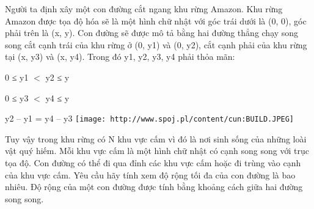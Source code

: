 Người ta định xây một con đường cắt ngang khu rừng Amazon. Khu rừng Amazon được tọa độ hóa sẽ là một hình chữ nhật với góc trái dưới là (0, 0), góc phải trên là (x, y). Con đường sẽ được mô tả bằng hai đường thẳng chạy song song cắt cạnh trái của khu rừng ở (0, y1) và (0, y2), cắt cạnh phải của khu rừng tại (x, y3) và (x, y4). Trong đó y1, y2, y3, y4 phải thỏa mãn:  

   0 ≤ y1 $<$ y2 ≤ y  

   0 ≤ y3 $<$ y4 ≤ y  

   y2 – y1 = y4 – y3  
\texttt{[image: http://www.spoj.pl/content/cun:BUILD.JPEG]}

   Tuy vậy trong khu rừng có N khu vực cấm vì đó là nơi sinh sống của những loài vật quý hiếm. Mỗi khu vực cấm là một hình chữ nhật có cạnh song song với trục tọa độ. Con đường có thể đi qua đỉnh các khu vực cấm hoặc đi trùng vào cạnh của khu vực cấm. Yêu cầu hãy tính xem độ rộng tối đa của con đường là bao nhiêu. Độ rộng của một con đường được tính bằng khoảng cách giữa hai đường song song.  

\